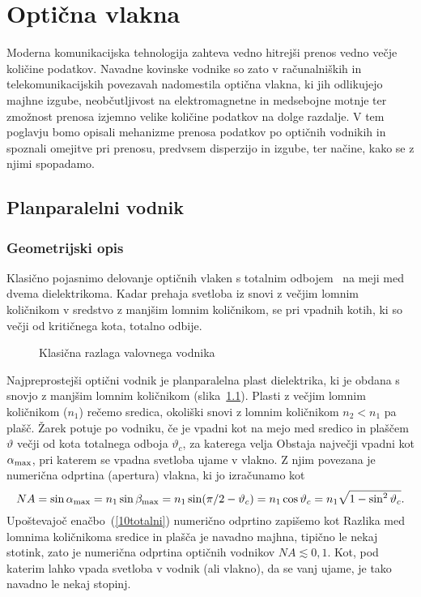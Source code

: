 
\chapter{Optična vlakna}
\label{chap:fibri}
Moderna komunikacijska tehnologija zahteva vedno hitrejši prenos
vedno večje količine podatkov. Navadne kovinske vodnike
so zato v računalniških in telekomunikacijskih povezavah nadomestila optična 
vlakna, ki jih odlikujejo majhne izgube, neobčutljivost na elektromagnetne
in medsebojne motnje ter zmožnost prenosa izjemno velike količine podatkov
na dolge razdalje. V tem poglavju bomo opisali mehanizme prenosa podatkov 
po optičnih vodnikih in spoznali omejitve pri prenosu,
predvsem disperzijo in izgube, ter načine, kako se z njimi spopadamo.

\section{Planparalelni vodnik}
\subsection*{Geometrijski opis}
Klasično pojasnimo delovanje optičnih vlaken s totalnim odbojem~
na meji med dvema dielektrikoma. Kadar prehaja svetloba iz snovi 
z večjim lomnim količnikom v sredstvo z manjšim lomnim količnikom,
se pri vpadnih kotih, ki so večji od kritičnega kota, totalno odbije. 
\begin{figure}[h]
\centering
\def\svgwidth{110truemm} 

\caption{Klasična razlaga valovnega vodnika}
\label{fig:vodnik}
\end{figure}

Najpreprostejši optični vodnik je planparalelna plast 
dielektrika, ki je obdana s snovjo z manjšim lomnim količnikom (slika~\ref{fig:vodnik}). 
Plasti z večjim lomnim količnikom ($n_1$) rečemo sredica, 
okoliški snovi z lomnim količnikom $n_2<n_1$ pa plašč. 
Žarek potuje po vodniku, če je vpadni kot 
na mejo med sredico in plaščem $\vartheta$ večji od kota totalnega odboja $\vartheta_c$, 
za katerega velja
Obstaja največji vpadni kot $\alpha_{\rm max}$, pri katerem se
vpadna svetloba ujame v vlakno.
Z njim povezana je numerična odprtina (apertura) vlakna, 
ki jo izračunamo kot 
\begin{equation}
NA = \sin \alpha_{\rm max} = n_1 \sin \beta_{\rm max} = 
n_1 \sin(\pi/2-\vartheta_c) =
n_1 \cos\vartheta_c = n_1 \sqrt{1-\sin^2\vartheta_c}.
\label{10NAa}
\end{equation}
Upoštevajoč enačbo~(\ref{10totalni}) numerično odprtino zapišemo kot 
Razlika med lomnima količnikoma sredice in plašča je navadno majhna,
tipično le nekaj stotink, zato je numerična odprtina optičnih 
vodnikov $NA \lesssim 0,1 $. Kot, pod katerim lahko vpada svetloba
v vodnik (ali vlakno), da se vanj ujame, je tako navadno le nekaj stopinj.

